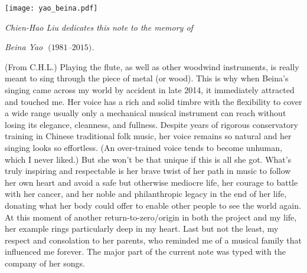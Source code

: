 \documentclass[11pt]{article}
\numberwithin{equation}{subsection}
\begin{document}
\begin{titlepage}

$ $

\vspace{12em}


\centerline{\texttt{[image: yao\_beina.pdf]}}

\bigskip

\centerline{\small\it
 Chien-Hao Liu dedicates this note to the memory of}
\centerline{\small\it
 Beina Yao $\;(1981$--$2015)$.}

\vspace{24em}

\baselineskip 11pt

{\footnotesize
\noindent
(From C.H.L.)
 Playing the flute, as well as other woodwind instruments,
   is really meant to sing through the piece of metal (or wood).
 This is why when Beina's singing came across my world by accident in late 2014,
   it immediately attracted and touched me.
 Her voice has a rich and solid timbre
    with the flexibility to cover a wide range
    usually only a mechanical musical instrument can reach without losing its elegance, cleanness, and fullness.
 Despite years of rigorous conservatory training in Chinese traditional folk music,
  her voice remains so natural and her singing looks so effortless.
 (An over-trained voice tends to become unhuman, which I never liked.)
 But she won't be that unique if this is all she got.
 What's truly inspiring and respectable is
  her brave twist of her path in music to follow her own heart and avoid a safe but otherwise mediocre life,
  her courage to battle with her cancer,  and
  her noble and philanthropic legacy in the end of her life,
    donating what her body could offer to enable other people to see the world again.
 At this moment of another return-to-zero/origin in both the project and my life,
  her example rings particularly deep in my heart.
 Last but not the least,
  my respect and consolation to her parents, who reminded me of a musical family that influenced me forever.
 The major part of the current note was typed with the company of her songs.
 } %


\end{titlepage}




\newpage
$ $

\vspace{-3em}
\end{document}
